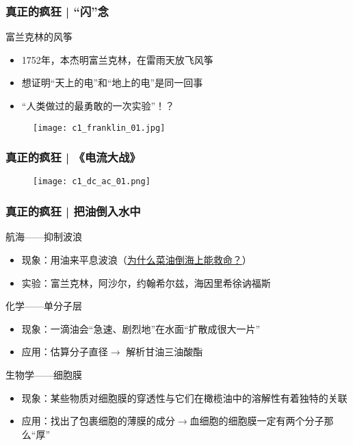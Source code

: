 \begin{frame}
  \frametitle{真正的疯狂 | “闪”念}
  \begin{block}{富兰克林的风筝}
    \begin{itemize}
      \item 1752年，本杰明\textbullet 富兰克林，在雷雨天放飞风筝
      \item 想证明“天上的电”和“地上的电”是同一回事
      \item “人类做过的最勇敢的一次实验”！？
    \end{itemize}
    \vspace{-1em}
    \begin{figure}
      \centering
      \texttt{[image: c1\_franklin\_01.jpg]}
    \end{figure}
  \end{block}
\end{frame}

\begin{frame}
  \frametitle{真正的疯狂 | 《电流大战》}
  \begin{figure}
    \centering
    \texttt{[image: c1\_dc\_ac\_01.png]}
  \end{figure}
\end{frame}

\begin{frame}
  \frametitle{真正的疯狂 | 把油倒入水中}
  \begin{block}{航海——抑制波浪}
    \begin{itemize}
      \item 现象：用油来平息波浪（\href{https://new.qq.com/omn/20200406/20200406A02ZUF00.html}{为什么菜油倒海上能救命？}）
      \item 实验：富兰克林，阿沙尔，约翰\textbullet 希尔兹，海因里希\textbullet 徐讷福斯
    \end{itemize}
  \end{block}
  \pause
  \begin{block}{化学——单分子层}
    \begin{itemize}
      \item 现象：一滴油会“急速、剧烈地”在水面“扩散成很大一片”
      \item 应用：估算分子直径$\longrightarrow$ 解析甘油三油酸酯
    \end{itemize}
  \end{block}
  \pause
  \begin{block}{生物学——细胞膜}
    \begin{itemize}
      \item 现象：某些物质对细胞膜的穿透性与它们在橄榄油中的溶解性有着独特的关联
      \item 应用：找出了包裹细胞的薄膜的成分$\longrightarrow$血细胞的细胞膜一定有两个分子那么“厚”
    \end{itemize}
  \end{block}
\end{frame}

